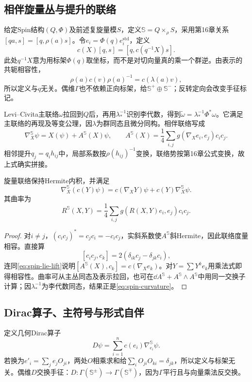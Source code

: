 \subsection{相伴旋量丛与提升的联络}
给定Spin结构$(Q,\Phi)$及前述复旋量模$S$，定义$\mathbb S=Q\times_\rho S$，采用第16章关系$[qa,s]=[q,\rho(a)s]$。令$e_i=\Phi(q)e_i^{\mathrm{std}}$，定义
\[
 c(X)[q,s]=[q,c(q^{-1}X)s].
\]
此处$q^{-1}X$意为用标架$\Phi(q)$取坐标，而不是对切向量真的乘一个群逆。由表示的共轭相容性，
\[
 \rho(a)c(v)\rho(a)^{-1}=c(\lambda(a)v),
\]
所以定义与$q$无关。偶维$\Gamma$也不依赖正向标架，给$\mathbb S^+\oplus\mathbb S^-$；反转定向会改变手征标记。

Levi--Civita主联络$\omega$拉回到$Q$后，再用$\lambda_*^{-1}$识别李代数，得到$\widetilde\omega=\lambda_*^{-1}\Phi^*\omega$。它满足主联络的再现及等变公理，因$\lambda$为群同态且微分同构。相伴联络写成
\begin{equation}\label{eq:spin-connection}
 \nabla_X^{\mathbb S}\psi=X(\psi)+A^{\mathbb S}(X)\psi,
 \qquad A^{\mathbb S}(X)=\frac14\sum_{i,j}
 g(\nabla_Xe_i,e_j)c_i c_j.
\end{equation}
相邻提升$q_j=q_i h_{ij}$中，局部系数按$\rho(h_{ij})^{-1}$变换，联络势按第16章公式变换，故上式确实拼接。

\begin{proposition}\label{prop:spin-compatible}
旋量联络保持Hermite内积，并满足
\[
 \nabla_X^{\mathbb S}(c(Y)\psi)=c(\nabla_XY)\psi+c(Y)\nabla_X^{\mathbb S}\psi.
\]
其曲率为
\begin{equation}\label{eq:spin-curvature}
 R^{\mathbb S}(X,Y)=\frac14\sum_{i,j}
 g(R(X,Y)e_i,e_j)c_i c_j.
\end{equation}
\end{proposition}
\begin{proof}
对$i\ne j$，$(c_ic_j)^*=c_jc_i=-c_ic_j$，实斜系数使$A^{\mathbb S}$斜Hermite，因此联络度量相容。直接算
\[
 [c_ic_j,c_k]=2(\delta_{ik}c_j-\delta_{jk}c_i),
\]
连同\eqref{eq:spin-lie-lift}说明$[A^{\mathbb S}(X),c_k]=c(\nabla_Xe_k)$。对$Y=\sum Y^ke_k$用乘法式即得相容性。曲率可从主丛同态及表示拉回，也可在$\dd A^{\mathbb S}+A^{\mathbb S}\wedge A^{\mathbb S}$中用同一交换子计算；因$\lambda_*^{-1}$为李代数同态，结果正是\eqref{eq:spin-curvature}。
\end{proof}

\subsection{Dirac算子、主符号与形式自伴}
定义几何Dirac算子
\begin{equation}\label{eq:geometric-dirac}
 D\psi=\sum_{i=1}^nc(e_i)\nabla^{\mathbb S}_{e_i}\psi.
\end{equation}
若换为$e'_i=\sum_j e_jO_{ji}$，两处$O$相乘求和给$\sum_iO_{ji}O_{ki}=\delta_{jk}$，所以定义与标架无关。偶维$D$交换手征：$D:\Gamma(\mathbb S^\pm)\to\Gamma(\mathbb S^\mp)$，因为$\Gamma$平行且与向量乘法反交换。


